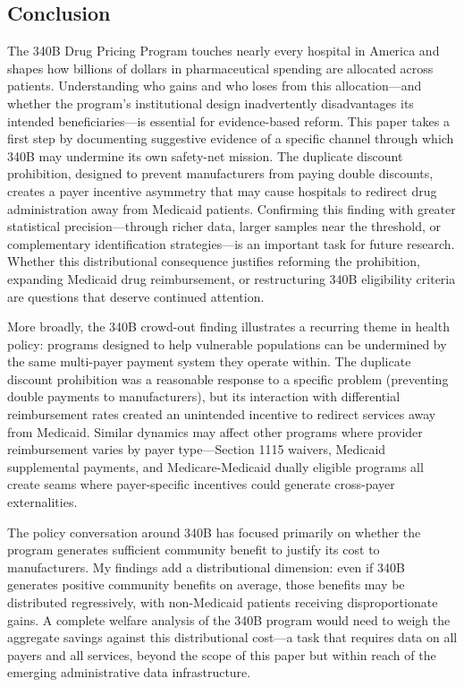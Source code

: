 \documentclass[12pt]{article}
\begin{document}
\subsection{Conclusion}

The 340B Drug Pricing Program touches nearly every hospital in America and shapes how billions of dollars in pharmaceutical spending are allocated across patients. Understanding who gains and who loses from this allocation---and whether the program's institutional design inadvertently disadvantages its intended beneficiaries---is essential for evidence-based reform. This paper takes a first step by documenting suggestive evidence of a specific channel through which 340B may undermine its own safety-net mission. The duplicate discount prohibition, designed to prevent manufacturers from paying double discounts, creates a payer incentive asymmetry that may cause hospitals to redirect drug administration away from Medicaid patients. Confirming this finding with greater statistical precision---through richer data, larger samples near the threshold, or complementary identification strategies---is an important task for future research. Whether this distributional consequence justifies reforming the prohibition, expanding Medicaid drug reimbursement, or restructuring 340B eligibility criteria are questions that deserve continued attention.

More broadly, the 340B crowd-out finding illustrates a recurring theme in health policy: programs designed to help vulnerable populations can be undermined by the same multi-payer payment system they operate within. The duplicate discount prohibition was a reasonable response to a specific problem (preventing double payments to manufacturers), but its interaction with differential reimbursement rates created an unintended incentive to redirect services away from Medicaid. Similar dynamics may affect other programs where provider reimbursement varies by payer type---Section 1115 waivers, Medicaid supplemental payments, and Medicare-Medicaid dually eligible programs all create seams where payer-specific incentives could generate cross-payer externalities.

The policy conversation around 340B has focused primarily on whether the program generates sufficient community benefit to justify its cost to manufacturers. My findings add a distributional dimension: even if 340B generates positive community benefits on average, those benefits may be distributed regressively, with non-Medicaid patients receiving disproportionate gains. A complete welfare analysis of the 340B program would need to weigh the aggregate savings against this distributional cost---a task that requires data on all payers and all services, beyond the scope of this paper but within reach of the emerging administrative data infrastructure.
\end{document}
